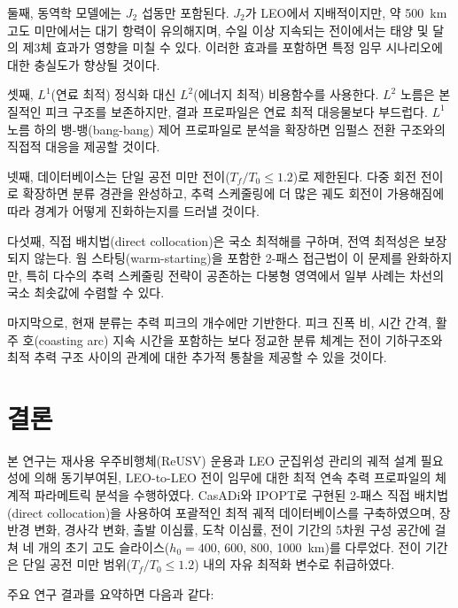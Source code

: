 \documentclass[a4paper,fleqn]{cas-dc}
\begin{document}
둘째, 동역학 모델에는 $J_2$ 섭동만 포함된다. $J_2$가 LEO에서 지배적이지만, 약 500~km 고도 미만에서는 대기 항력이 유의해지며, 수일 이상 지속되는 전이에서는 태양 및 달의 제3체 효과가 영향을 미칠 수 있다. 이러한 효과를 포함하면 특정 임무 시나리오에 대한 충실도가 향상될 것이다.

셋째, $L^1$(연료 최적) 정식화 대신 $L^2$(에너지 최적) 비용함수를 사용한다. $L^2$ 노름은 본질적인 피크 구조를 보존하지만, 결과 프로파일은 연료 최적 대응물보다 부드럽다. $L^1$ 노름 하의 뱅-뱅(bang-bang) 제어 프로파일로 분석을 확장하면 임펄스 전환 구조와의 직접적 대응을 제공할 것이다.

넷째, 데이터베이스는 단일 공전 미만 전이($T_f/T_0 \leq 1.2$)로 제한된다. 다중 회전 전이로 확장하면 분류 경관을 완성하고, 추력 스케줄링에 더 많은 궤도 회전이 가용해짐에 따라 경계가 어떻게 진화하는지를 드러낼 것이다.

다섯째, 직접 배치법(direct collocation)은 국소 최적해를 구하며, 전역 최적성은 보장되지 않는다. 웜 스타팅(warm-starting)을 포함한 2-패스 접근법이 이 문제를 완화하지만, 특히 다수의 추력 스케줄링 전략이 공존하는 다봉형 영역에서 일부 사례는 차선의 국소 최솟값에 수렴할 수 있다.

마지막으로, 현재 분류는 추력 피크의 개수에만 기반한다. 피크 진폭 비, 시간 간격, 활주 호(coasting arc) 지속 시간을 포함하는 보다 정교한 분류 체계는 전이 기하구조와 최적 추력 구조 사이의 관계에 대한 추가적 통찰을 제공할 수 있을 것이다.


\section{결론}\label{sec:conclusions}

본 연구는 재사용 우주비행체(ReUSV) 운용과 LEO 군집위성 관리의 궤적 설계 필요성에 의해 동기부여된, LEO-to-LEO 전이 임무에 대한 최적 연속 추력 프로파일의 체계적 파라메트릭 분석을 수행하였다. CasADi와 IPOPT로 구현된 2-패스 직접 배치법(direct collocation)을 사용하여 포괄적인 최적 궤적 데이터베이스를 구축하였으며, 장반경 변화, 경사각 변화, 출발 이심률, 도착 이심률, 전이 기간의 5차원 구성 공간에 걸쳐 네 개의 초기 고도 슬라이스($h_0 = 400$, 600, 800, 1000~km)를 다루었다. 전이 기간은 단일 공전 미만 범위($T_f/T_0 \leq 1.2$) 내의 자유 최적화 변수로 취급하였다.

주요 연구 결과를 요약하면 다음과 같다:
\end{document}
